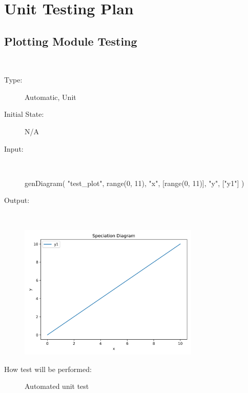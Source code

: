 \documentclass[12pt, titlepage]{article}
\newcounter{testnum} %
\begin{document}
\newpage		
\section{Unit Testing Plan}

\subsection{Plotting Module Testing}
\begin{addmargin}[2em]{0em}

\\
\begin{addmargin}[2em]{0em}
\begin{description}
\item[Type:] Automatic, Unit
					
\item[Initial State:] N/A
					
\item[Input:] ~\newline

\begin{python}
genDiagram( "test_plot", 
            range(0, 11), 
            "x", 
            [range(0, 11)], 
            "y", 
            ["y1"] )
\end{python}
					
\item[Output:] ~\newline

\includegraphics[width=0.7\textwidth]{test_plot_ref}
					
\item[How test will be performed:] Automated unit test\\
\end{description}
\end{addmargin}

\end{addmargin}
\end{document}
